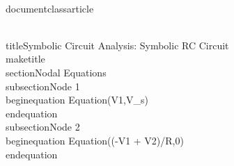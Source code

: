 \\documentclass{article}
\begin{document}
\\title{Symbolic Circuit Analysis: Symbolic RC Circuit}
\\maketitle
\\section{Nodal Equations}
\\subsection{Node 1}
\\begin{equation}
Equation(V1,V_s)
\\end{equation}
\\subsection{Node 2}
\\begin{equation}
Equation((-V1 + V2)/R,0)
\\end{equation}
\
\end{document}
